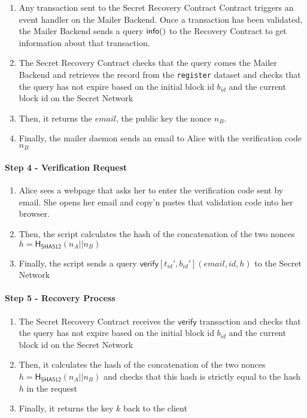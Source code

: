 \documentclass[12pt]{article}
\newcommand{\ms}[1]{\ensuremath{\mathsf{#1}}}
\newcommand{\tx}[3]{\ms{#1}[#2](#3)}
\newcommand{\qry}[3]{\ms{#1}(#3)}
\begin{document}
\begin{enumerate}
\begin{enumerate}[label=3.\arabic*]
  \item Any transaction sent to the Secret Recovery Contract Contract triggers an event handler on the Mailer Backend. Once a transaction has been validated, the Mailer Backend sends a query $\qry{info}{t_id}$ to the Recovery Contract to get information about that transaction.
  \item The Secret Recovery Contract checks that the query comes the Mailer Backend and retrieves the record from the {\tt register} dataset and checks that the query has not expire based on the initial block id $b_{id}$ and the current block id on the Secret Network
  \item Then, it returns the $email$, the public key the nonce $n_B$.
  \item Finally, the mailer daemon sends an email to Alice with the verification code $n_B$
\end{enumerate}

\paragraph{{\bf Step 4} - Verification Request}

\begin{enumerate}[label=4.\arabic*]
  \item Alice sees a webpage that asks her to enter the verification code sent by email. She opens her email and copy'n pastes that validation code into her browser.
  \item Then, the script calculates the hash of the concatenation of the two nonces $h=\ms{H_{\ms{SHA512}}}(n_A || n_B)$
  \item Finally, the script sends a query $\tx{verify}{t_{id}', b_{id}'}{email, id, h}$ to the Secret Network
\end{enumerate}

\paragraph{Step 5 - Recovery Process}

\begin{enumerate}[label=5.\arabic*]
    \item The Secret Recovery Contract receives the $\ms{verify}$ transaction and checks that the query has not expire based on the initial block id $b_{id}$ and the current block id on the Secret Network
  \item Then, it calculates the hash of the concatenation of the two nonces $h=\ms{H_{\ms{SHA512}}}(n_A || n_B)$ and checks that this hash is strictly equal to the hash $h$ in the request
  \item Finally, it returns the key $k$ back to the client
\end{enumerate}


\end{enumerate}
\end{document}
